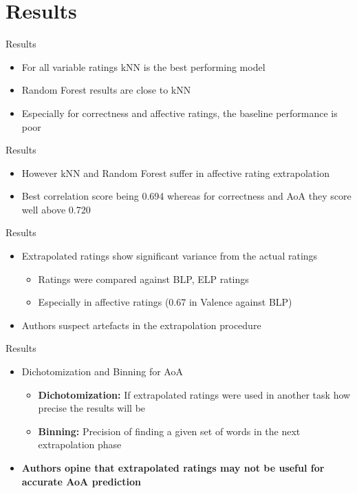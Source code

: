 \documentclass{beamer}
\begin{document}
\section{Results}
\begin{frame}{Results}
\begin{itemize}
    \item For all variable ratings kNN is the best performing model
    \item Random Forest results are close to kNN
    \item Especially for correctness and affective ratings, the baseline performance is poor
\end{itemize}
\end{frame}

\begin{frame}{Results}
\begin{itemize}
    \item However kNN and Random Forest suffer in affective rating extrapolation
    \item Best correlation score being 0.694 whereas for correctness and AoA they score well above 0.720
\end{itemize}
\end{frame}

\begin{frame}{Results}
\begin{itemize}
    \item Extrapolated ratings show significant variance from the actual ratings
    \begin{itemize}
        \item Ratings were compared against BLP, ELP ratings
        \item Especially in affective ratings (0.67 in Valence against BLP)
    \end{itemize}
    \item Authors suspect artefacts in the extrapolation procedure
\end{itemize}
\end{frame}

\begin{frame}{Results}
\begin{itemize}
    \item Dichotomization and Binning for AoA
    \begin{itemize}
        \item \textbf{Dichotomization:} If extrapolated ratings were used in another task how precise the results will be
        \item \textbf{Binning:} Precision of finding a given set of words in the next extrapolation phase 
    \end{itemize}
    \item \textbf{Authors opine that extrapolated ratings may not be useful for accurate AoA prediction}
\end{itemize}
\end{frame}
\end{document}
